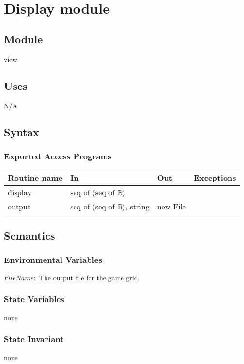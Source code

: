 \documentclass[12pt]{article}
\begin{document}
\newpage

\section* {Display module}

\subsection*{Module}

view

\subsection* {Uses}

\noindent N/A

\subsection* {Syntax}

\subsubsection* {Exported Access Programs}

\begin{tabular}{| l | l | l | l |}
\hline
\textbf{Routine name} & \textbf{In} & \textbf{Out} & \textbf{Exceptions}\\
\hline
display & seq of (seq of $\mathbb{B}$) & &\\
\hline
output  & seq of (seq of $\mathbb{B}$), string & new File &\\
\hline
\end{tabular}

\subsection* {Semantics}

\subsubsection* {Environmental Variables}
$FileName:$ The output file for the game grid.

\subsubsection* {State Variables}
none
\subsubsection* {State Invariant}
none
\end{document}
